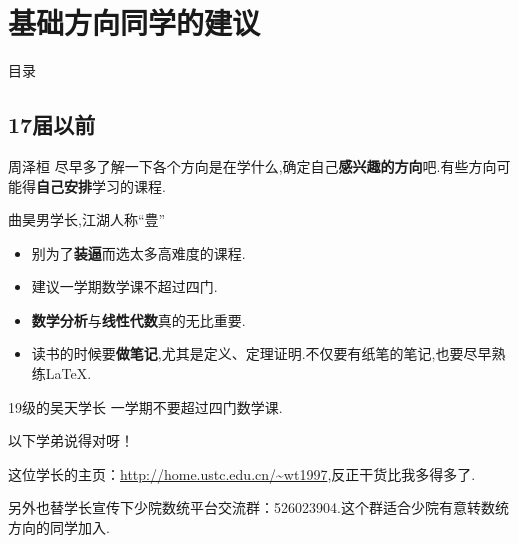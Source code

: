 \documentclass[pdf]{beamer}
\numberwithin{equation}{section}
\theoremstyle{plain}
\theoremstyle{plain}
\theoremstyle{plain}
\theoremstyle{remark}
\begin{document}
\section{基础方向同学的建议}
\begin{frame}{目录}
\tableofcontents[currentsection]
\end{frame}
\subsection{17届以前}
\begin{frame}
\begin{block}{周泽桓}
\hspace*{20pt}尽早多了解一下各个方向是在学什么,确定自己\textbf{感兴趣的方向}吧.有些方向可能得\textbf{自己安排}学习的课程.

\end{block}
\begin{block}{曲昊男学长,江湖人称“豊”}
\begin{itemize}
	\item 别为了\textbf{装逼}而选太多高难度的课程.
	\item 建议一学期数学课不超过四门.
	\item \textbf{数学分析}与\textbf{线性代数}真的无比重要.
	\item 读书的时候要\textbf{做笔记},尤其是定义、定理证明.不仅要有纸笔的笔记,也要尽早熟练\LaTeX.
\end{itemize}
\end{block}
\end{frame}
\begin{frame}
\begin{block}{19级的吴天学长}
	\hspace*{20pt}
	一学期不要超过四门数学课.
	
	\hspace*{20pt}以下学弟说得对呀！
\end{block}
\hspace*{20pt}这位学长的主页：\url{http://home.ustc.edu.cn/~wt1997},反正干货比我多得多了.

\hspace*{20pt}另外也替学长宣传下少院数统平台交流群：526023904.这个群适合少院有意转数统方向的同学加入.
\end{frame}
\end{document}
